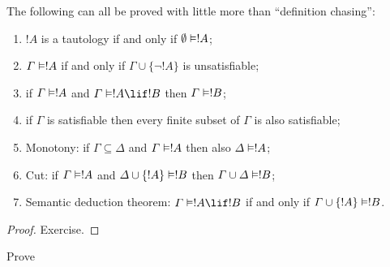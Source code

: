 \documentclass[../../../include/open-logic-section]{subfiles}
\begin{document}
\begin{prop}
The following can all be proved
with little more than ``definition chasing'': 
\begin{enumerate} 
\item $!A$ is a tautology if and only if
  $\emptyset \Entails !A$; 
\item $\Gamma \Entails !A$ if and only if $\Gamma \cup \{ \lnot !A\}$
  is unsatisfiable; 
\item if $\Gamma \Entails !A$ and $\Gamma \Entails !A \lif !B$ then
  $\Gamma \Entails !B$;
\item if $\Gamma$ is satisfiable then every finite subset of $\Gamma$
  is also satisfiable; 
\item {} Monotony: if $\Gamma \subseteq \Delta$
  and $\Gamma \Entails !A$ then also $\Delta \Entails !A$;
\item {} Cut: if $\Gamma \Entails !A$ and $\Delta \cup \{
!A\} \Entails !B$ then $\Gamma \cup \Delta \Entails !B$; 
\item
{} Semantic deduction theorem: $\Gamma
\Entails !A \lif !B$ if and only if $\Gamma \cup \{!A\} \Entails
!B$.
\end{enumerate}
\end{prop}

\begin{proof}
Exercise.
\end{proof}

\begin{prob}
Prove 
\end{prob}
\end{document}
